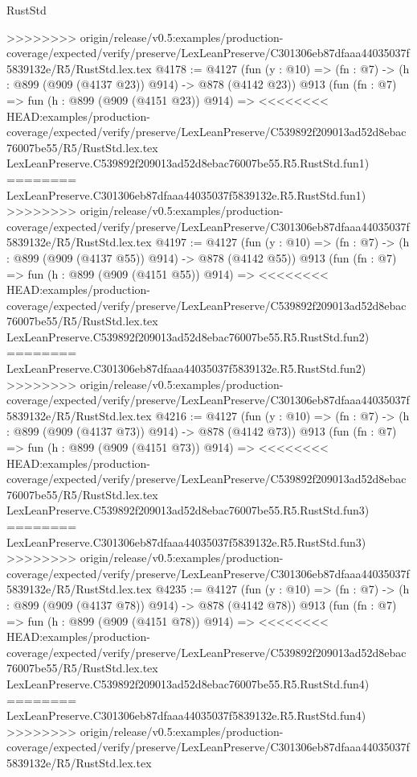 \begin{lexlean}{RustStd}
\begin{coremodule}
{\begin{coremodule}
{{{{{{{{{>>>>>>>> origin/release/v0.5:examples/production-coverage/expected/verify/preserve/LexLeanPreserve/C301306eb87dfaaa44035037f5839132e/R5/RustStd.lex.tex
@4178 := @4127
    (fun (y : @10) => (fn : @7) -> (h : @899 (@909 (@4137 @23)) @914) -> @878 (@4142 @23))
    @913
    (fun (fn : @7) =>
    fun (h : @899 (@909 (@4151 @23)) @914) =>
<<<<<<<< HEAD:examples/production-coverage/expected/verify/preserve/LexLeanPreserve/C539892f209013ad52d8ebac76007be55/R5/RustStd.lex.tex
    LexLeanPreserve.C539892f209013ad52d8ebac76007be55.R5.RustStd.fun1)
========
    LexLeanPreserve.C301306eb87dfaaa44035037f5839132e.R5.RustStd.fun1)
>>>>>>>> origin/release/v0.5:examples/production-coverage/expected/verify/preserve/LexLeanPreserve/C301306eb87dfaaa44035037f5839132e/R5/RustStd.lex.tex
@4197 := @4127
    (fun (y : @10) => (fn : @7) -> (h : @899 (@909 (@4137 @55)) @914) -> @878 (@4142 @55))
    @913
    (fun (fn : @7) =>
    fun (h : @899 (@909 (@4151 @55)) @914) =>
<<<<<<<< HEAD:examples/production-coverage/expected/verify/preserve/LexLeanPreserve/C539892f209013ad52d8ebac76007be55/R5/RustStd.lex.tex
    LexLeanPreserve.C539892f209013ad52d8ebac76007be55.R5.RustStd.fun2)
========
    LexLeanPreserve.C301306eb87dfaaa44035037f5839132e.R5.RustStd.fun2)
>>>>>>>> origin/release/v0.5:examples/production-coverage/expected/verify/preserve/LexLeanPreserve/C301306eb87dfaaa44035037f5839132e/R5/RustStd.lex.tex
@4216 := @4127
    (fun (y : @10) => (fn : @7) -> (h : @899 (@909 (@4137 @73)) @914) -> @878 (@4142 @73))
    @913
    (fun (fn : @7) =>
    fun (h : @899 (@909 (@4151 @73)) @914) =>
<<<<<<<< HEAD:examples/production-coverage/expected/verify/preserve/LexLeanPreserve/C539892f209013ad52d8ebac76007be55/R5/RustStd.lex.tex
    LexLeanPreserve.C539892f209013ad52d8ebac76007be55.R5.RustStd.fun3)
========
    LexLeanPreserve.C301306eb87dfaaa44035037f5839132e.R5.RustStd.fun3)
>>>>>>>> origin/release/v0.5:examples/production-coverage/expected/verify/preserve/LexLeanPreserve/C301306eb87dfaaa44035037f5839132e/R5/RustStd.lex.tex
@4235 := @4127
    (fun (y : @10) => (fn : @7) -> (h : @899 (@909 (@4137 @78)) @914) -> @878 (@4142 @78))
    @913
    (fun (fn : @7) =>
    fun (h : @899 (@909 (@4151 @78)) @914) =>
<<<<<<<< HEAD:examples/production-coverage/expected/verify/preserve/LexLeanPreserve/C539892f209013ad52d8ebac76007be55/R5/RustStd.lex.tex
    LexLeanPreserve.C539892f209013ad52d8ebac76007be55.R5.RustStd.fun4)
========
    LexLeanPreserve.C301306eb87dfaaa44035037f5839132e.R5.RustStd.fun4)
>>>>>>>> origin/release/v0.5:examples/production-coverage/expected/verify/preserve/LexLeanPreserve/C301306eb87dfaaa44035037f5839132e/R5/RustStd.lex.tex
}}}}}}}}}
\end{coremodule}}
\end{coremodule}
\end{lexlean}
